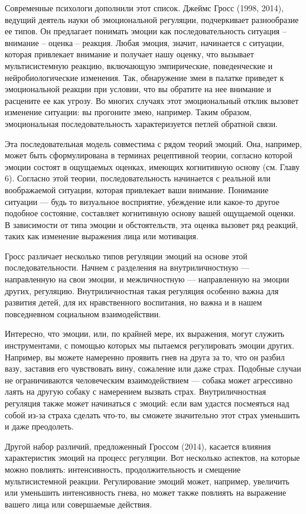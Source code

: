\documentclass[11pt]{book}
\begin{document}
Современные психологи дополнили этот список. Джеймс Гросс (1998, 2014), ведущий деятель науки об эмоциональной регуляции, подчеркивает разнообразие ее типов. Он предлагает понимать эмоции как последовательность ситуация -- внимание -- оценка -- реакция. Любая эмоция, значит, начинается с ситуации, которая привлекает внимание и получает нашу оценку, что вызывает мультисистемную реакцию, включающую эмпирические, поведенческие и нейробиологические изменения. Так, обнаружение змеи в палатке приведет к эмоциональной реакции при условии, что вы обратите на нее внимание и расцените ее как угрозу. Во многих случаях этот эмоциональный отклик вызовет изменение ситуации: вы прогоните змею, например. Таким образом, эмоциональная последовательность характеризуется петлей обратной связи.

Эта последовательная модель совместима с рядом теорий эмоций. Она, например, может быть сформулирована в терминах рецептивной теории, согласно которой эмоции состоят в ощущаемых оценках, имеющих когнитивную основу (см. Главу 6). Согласно этой теории, последовательность начинается с реальной или воображаемой ситуации, которая привлекает ваши внимание. Понимание ситуации --- будь то визуальное восприятие, убеждение или какое-то другое подобное состояние, составляет когнитивную основу вашей ощущаемой оценки. В зависимости от типа эмоции и обстоятельств, эта оценка вызовет ряд реакций, таких как изменение выражения лица или мотивация.

Гросс различает несколько типов регуляции эмоций на основе этой последовательности. Начнем с разделения на внутриличностную --- направленную на свои эмоции, и межличностную --- направленную на эмоции других, регуляцию. Внутриличностная такая регуляция особенно важна для развития детей, для их нравственного воспитания, но важна и в нашем повседневном социальном взаимодействии.

Интересно, что эмоции, или, по крайней мере, их выражения, могут служить инструментами, с помощью которых мы пытаемся регулировать эмоции других. Например, вы можете намеренно проявить гнев на друга за то, что он разбил вазу, заставив его чувствовать вину, сожаление или даже страх. Подобные случаи не ограничиваются человеческим взаимодействием --- собака может агрессивно лаять на другую собаку с намерением вызвать страх. Внутриличностная регуляция также может начинаться с эмоций: если вам удастся посмеяться над собой из-за страха сделать что-то, вы сможете значительно этот страх уменьшить и даже преодолеть.

Другой набор различий, предложенный Гроссом (2014), касается влияния характеристик эмоций на процесс регуляции. Вот несколько аспектов, на которые можно повлиять: интенсивность, продолжительность и смещение мультисистемной реакции. Регулирование эмоций может, например, увеличить или уменьшить интенсивность гнева, но может также повлиять на выражение вашего лица или совершаемые действия.
\end{document}
